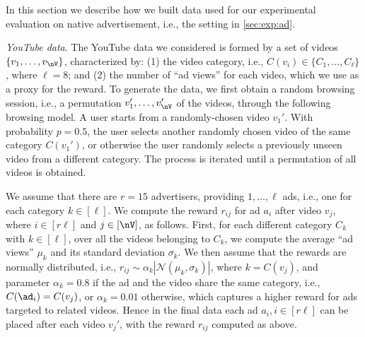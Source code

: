 In this section we describe how we built data used for our experimental evaluation on native advertisement, i.e., the setting in \cref{sec:exp:ad}.

\smallskip
\noindent
\emph{YouTube data}. The YouTube data we considered is formed by a set of videos $\{v_1, \dots, v_\nV\}$, characterized by: 
(1) the video category, i.e., $C(v_i) \in \{C_1,\dots,C_\ell\}$, where $\ell=8$; 
and (2) the number of ``ad views'' for each video, 
which we use as a proxy for the reward. %
To generate the data, we first obtain a random browsing session, i.e., 
a permutation $v_1',\dots,v_\nV'$ of the videos, through the following browsing model. 
A user starts from a randomly-chosen video $v_1'$. 
With probability $p=0.5$, the user selects another randomly chosen video of the same category $C(v_1')$, 
or otherwise the user randomly selects a previously unseen video from a different category.
The process is iterated until a permutation of all videos is obtained. 


We assume that there are $r=15$ advertisers, providing $1,\dots,\ell$ ads, i.e., one for each category $k \in [\ell]$.  
We compute the reward $r_{ij}$ for ad $a_i$ after video $v_j$, where $i \in [r\ell]$ and $j \in[\nV]$, as follows. 
First, for each different category $C_k$ with $k \in [\ell]$, over all the videos belonging to $C_k$, 
we compute the average ``ad views'' $\mu_k$ and its standard deviation $\sigma_k$. 
We then assume that the rewards are normally distributed, i.e., 
$r_{ij} \sim \alpha_k |\mathcal{N}(\mu_k, \sigma_k)|$,
where $k = C(v_j)$, and
parameter $\alpha_k = 0.8$ if the ad and the video share the same category,
i.e., $C(\ad_i) = C(v_j)$,
or $\alpha_k=0.01$ otherwise, 
which captures a higher reward for ads targeted to related videos. 
Hence in the final data each ad $a_i, i\in [r\ell]$ can be placed after each video $v_j'$, 
with the reward $r_{ij}$ computed as above.


